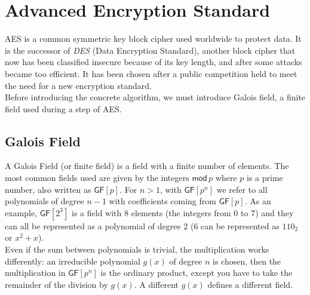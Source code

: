 \section{Advanced Encryption Standard}
AES is a common symmetric key block cipher used worldwide to protect data. It is the successor of \emph{DES} (Data Encryption Standard), another block cipher that now has been classified insecure because of its key length, and after some attacks became too efficient. It has been chosen after a public competition held to meet the need for a new encryption standard.\\
Before introducing the concrete algorithm, we must introduce Galois field, a finite field used during a step of AES.

\subsection{Galois Field}
A Galois Field (or finite field) is a field with a finite number of elements. The most common fields used are given by the integers $\mathsf{mod}\,p$ where $p$ is a prime number, also written as $\mathsf{GF}[p]$. For $n > 1$, with $\mathsf{GF}[p^n]$ we refer to all polynomials of degree $n-1$ with coefficients coming from $\mathsf{GF}[p]$. As an example, $\mathsf{GF}[2^3]$ is a field with $8$ elements (the integers from 0 to 7) and they can all be represented as a polynomial of degree $2$ (6 can be represented as $110_2$ or $x^2+x$).\\
Even if the sum between polynomials is trivial, the multiplication works differently: an irreducible polynomial $g(x)$ of degree $n$ is chosen, then the multiplication in $\mathsf{GF}[p^n]$ is the ordinary product, except you have to take the remainder of the division by $g(x)$. A different $g(x)$ defines a different field.


